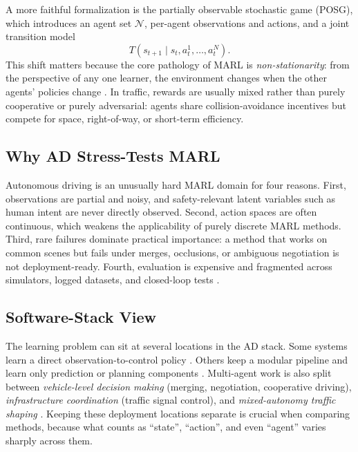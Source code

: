\documentclass[12pt, a4paper]{article}
\begin{document}
A more faithful formalization is the partially observable stochastic game (POSG),
which introduces an agent set $\mathcal{N}$, per-agent observations and actions,
and a joint transition model
\begin{equation}
T(s_{t+1} \mid s_t, a_t^1, \dots, a_t^N).
\label{eq:posg}
\end{equation}
This shift matters because the core pathology of MARL is \emph{non-stationarity}:
from the perspective of any one learner, the environment changes when the other
agents' policies change \cite{littman1994markov,bernstein2002complexity,lowe2017multi,zhang2021multi}. In traffic, rewards are usually mixed rather than purely cooperative or purely adversarial: agents share collision-avoidance incentives but compete for space, right-of-way, or short-term efficiency.

\subsection{Why AD Stress-Tests MARL}

Autonomous driving is an unusually hard MARL domain for four reasons. First,
observations are partial and noisy, and safety-relevant latent variables such as
human intent are never directly observed. Second, action spaces are often
continuous, which weakens the applicability of purely discrete MARL methods.
Third, rare failures dominate practical importance: a method that works on common
scenes but fails under merges, occlusions, or ambiguous negotiation is not
deployment-ready. Fourth, evaluation is expensive and fragmented across
simulators, logged datasets, and closed-loop tests \cite{caesar2021nuplan,zhou2020smarts,dosovitskiy2017carlaopenurbandriving,kiran2021deep}.

\subsection{Software-Stack View}

The learning problem can sit at several locations in the AD stack. Some systems
learn a direct observation-to-control policy \cite{bojarski2016end}. Others keep
a modular pipeline and learn only prediction or planning components
\cite{gao2020vectornet,liang2020lanegcn,song2020pip}. Multi-agent work is also
split between \emph{vehicle-level decision making} (merging, negotiation,
cooperative driving), \emph{infrastructure coordination} (traffic signal
control), and \emph{mixed-autonomy traffic shaping}
\cite{wei2019colight,wei2019presslight,stern2018dissipation,wu2017flow}.
Keeping these deployment locations separate is crucial when comparing methods,
because what counts as ``state'', ``action'', and even ``agent'' varies sharply
across them.
\end{document}
